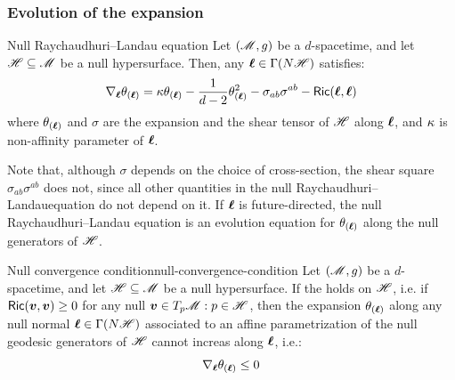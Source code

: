 \subsubsection{Evolution of the expansion}

\begin{theorem}{Null Raychaudhuri--Landau equation}{}
  Let $ (\mathscr{M} , g) $ be a $ d $-spacetime, and let $ \mathscr{H} \subseteq \mathscr{M} $ be a null hypersurface. Then, any $ \boldsymbol{\ell} \in \Gamma(N \mathscr{H}) $ satisfies:
  \begin{equation}
    \nabla_{\boldsymbol{\ell}} \theta_{(\boldsymbol{\ell})} = \kappa \theta_{(\boldsymbol{\ell})} - \frac{1}{d - 2} \theta_{(\boldsymbol{\ell})}^2 - \sigma_{ab} \sigma^{ab} - \textsf{Ric}(\boldsymbol{\ell} , \boldsymbol{\ell})
    \label{eq:raychaudhuri-landau}
  \end{equation}
  where $ \theta_{(\boldsymbol{\ell})} $ and $ \sigma $ are the expansion and the shear tensor of $ \mathscr{H} $ along $ \boldsymbol{\ell} $, and $ \kappa $ is non-affinity parameter of $ \boldsymbol{\ell} $.
\end{theorem}

Note that, although $ \sigma $ depends on the choice of cross-section, the shear square $ \sigma_{ab} \sigma^{ab} $ does not, since all other quantities in the null Raychaudhuri--Landau\footnotemark equation do not depend on it.
If $ \boldsymbol{\ell} $ is future-directed, the null Raychaudhuri--Landau equation is an evolution equation for $ \theta_{(\boldsymbol{\ell})} $ along the null generators of $ \mathscr{H} $.


\begin{proposition}{Null convergence condition}{null-convergence-condition}
  Let $ (\mathscr{M} , g) $ be a $ d $-spacetime, and let $ \mathscr{H} \subseteq \mathscr{M} $ be a null hypersurface. If the  holds on $ \mathscr{H} $, i.e. if $ \textsf{Ric}(\boldsymbol{v} , \boldsymbol{v}) \geq 0 $ for any null $ \boldsymbol{v} \in T_p\mathscr{M} : p \in \mathscr{H} $, then the expansion $ \theta_{(\boldsymbol{\ell})} $ along any null normal $ \boldsymbol{\ell} \in \Gamma(N\mathscr{H}) $ associated to an affine parametrization of the null geodesic generators of $ \mathscr{H} $ cannot increas along $ \boldsymbol{\ell} $, i.e.:
  \begin{equation}
    \nabla_{\boldsymbol{\ell}} \theta_{(\boldsymbol{\ell})} \leq 0
  \end{equation}
\end{proposition}

